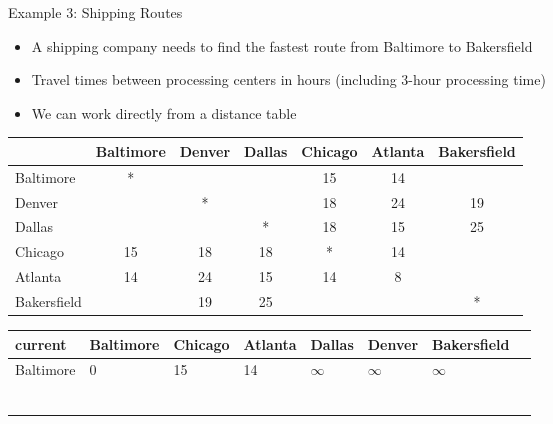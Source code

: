 \documentclass{beamer}
\begin{document}
\begin{frame}{Example 3: Shipping Routes}
\begin{itemize}
\item A shipping company needs to find the fastest route from Baltimore to Bakersfield
\item Travel times between processing centers in hours (including 3-hour processing time)
\item We can work directly from a distance table
\end{itemize}

\small
\begin{tabular}{|l|c|c|c|c|c|c|}
\hline
 & Baltimore & Denver & Dallas & Chicago & Atlanta & Bakersfield\\
\hline
Baltimore & * &&&15&14&\\
\hline
Denver &&*&&18&24&19\\
\hline
Dallas&&&*&18&15&25\\
\hline
Chicago &15&18&18&*&14&\\
\hline
Atlanta & 14 & 24&15&14&8&\\
\hline
Bakersfield &&19&25&&&*\\
\hline
\end{tabular}
\end{frame}









\begin{frame}

\begin{tabular}{|l|l|l|l|l|l|l|l|}
\hline
current & Baltimore & Chicago & Atlanta & Dallas & Denver & Bakersfield  \\ \hline
Baltimore & 0 & 15 & 14 & $\infty$ & $\infty$ & $\infty$ \\ \hline
&&&&&& \\ \hline
&&&&&& \\ \hline
&&&&&& \\ \hline
&&&&&& \\ \hline
&&&&&& \\ \hline
&&&&&& \\ \hline
\end{tabular}

\end{frame}

\begin{frame}
\end{frame}
\end{document}
